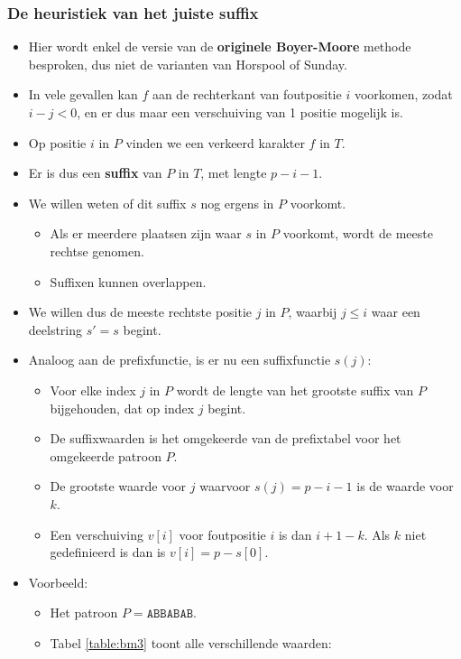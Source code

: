 \subsubsection{De heuristiek van het juiste suffix}
\begin{itemize}
    \item Hier wordt enkel de versie van de \textbf{originele Boyer-Moore} methode besproken, dus niet de varianten van Horspool of Sunday.
    \item In vele gevallen kan $f$ aan de rechterkant van foutpositie $i$ voorkomen, zodat $i - j < 0$, en er dus maar een verschuiving van 1 positie mogelijk is.
    \item Op positie $i$ in $P$ vinden we een verkeerd karakter $f$ in $T$.
    \item Er is dus een \textbf{suffix} van $P$ in $T$, met lengte $p - i - 1$.
    \item We willen weten of dit suffix $s$ nog ergens in $P$ voorkomt.
    \begin{itemize}
        \item Als er meerdere plaatsen zijn waar $s$ in $P$ voorkomt, wordt de meeste rechtse genomen.
        \item Suffixen kunnen overlappen.
    \end{itemize}
    \item We willen dus de meeste rechtste positie $j$ in $P$, waarbij $j \leq i$ waar een deelstring $s' = s$ begint.
    \item Analoog aan de prefixfunctie, is er nu een suffixfunctie $s(j)$:
    \begin{itemize}
        \item Voor elke index $j$ in $P$ wordt de lengte van het grootste suffix van $P$ bijgehouden, dat op index $j$ begint.
        \item De suffixwaarden is het omgekeerde van de prefixtabel voor het omgekeerde patroon $P$.
        \item De grootste waarde voor $j$ waarvoor $s(j) = p - i - 1$ is de waarde voor $k$.
        \item Een verschuiving $v[i]$ voor foutpositie $i$ is dan $i + 1 - k$. Als $k$ niet gedefinieerd is dan is $v[i] = p - s[0]$.
    \end{itemize}
    \item Voorbeeld:
    \begin{itemize}
        \item Het patroon $P = \texttt{ABBABAB}$.
        \item Tabel \ref{table:bm3} toont alle verschillende waarden:

\end{itemize}
\end{itemize}
